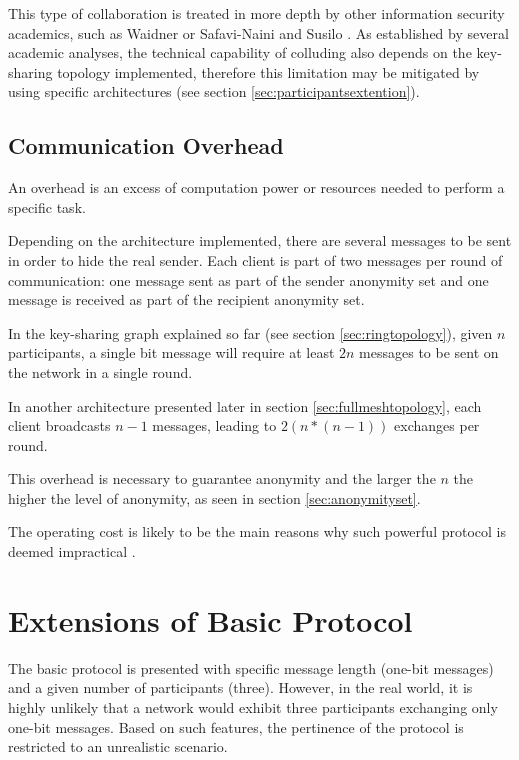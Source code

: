 This type of collaboration is treated in more depth by other information security academics, such as Waidner \cite{Waidner} or Safavi-Naini and Susilo \cite{Susilo}. As established by several academic analyses, the technical capability of colluding also depends on the key-sharing topology implemented, therefore this limitation may be mitigated by using specific architectures (see section \ref{sec:participantsextention}). 


\subsection{Communication Overhead} \label{sec:complexitylimitation}
An overhead is an excess of computation power or resources needed to perform a specific task. 

Depending on the architecture implemented, there are several messages to be sent in order to hide the real sender. Each client is part of two messages per round of communication: one message sent as part of the sender anonymity set and one message is received as part of the recipient anonymity set.

In the key-sharing graph explained so far (see section \ref{sec:ringtopology}), given $n$ participants, a single bit message will require at least $2n$ messages to be sent on the network in a single round. 

In another architecture presented later in section \ref{sec:fullmeshtopology}, each client broadcasts $n-1$ messages, leading to $2(n * (n - 1))$ exchanges per round.

This overhead is necessary to guarantee anonymity and the larger the $n$ the higher the level of anonymity, as seen in section \ref{sec:anonymityset}. 

The operating cost is likely to be the main reasons why such powerful protocol is deemed impractical \cite{Scholz}.


\section{Extensions of Basic Protocol}

The basic protocol is presented with specific message length (one-bit messages) and a given number of participants (three). However, in the real world, it is highly unlikely that a network would exhibit three participants exchanging only one-bit messages. Based on such features, the pertinence of the protocol is restricted to an unrealistic scenario. 


